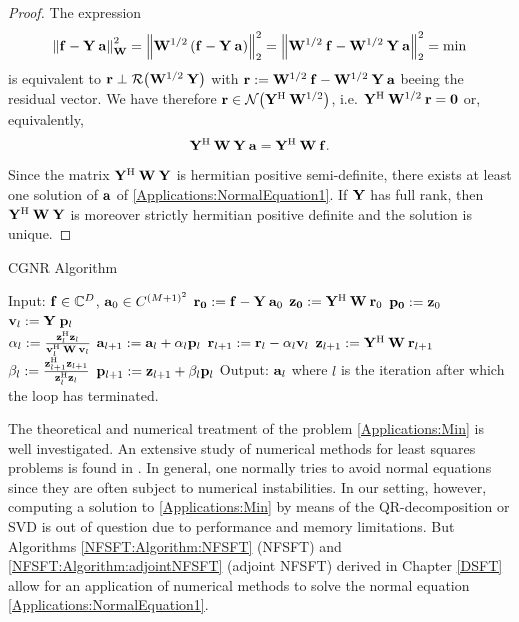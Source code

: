   \begin{proof}
    The expression 
    \[
      \left\|\mathbf{f} - \mathbf{Y}\:\mathbf{a}\right\|_{\mathbf{W}}^2 = 
      \left\|\mathbf{W}^{1/2}\left(\mathbf{f} - \mathbf{Y}\:\mathbf{a}\right)\right\|_{2}^2 = 
      \left\|\mathbf{W}^{1/2}\:\mathbf{f} - \mathbf{W}^{1/2}\:\mathbf{Y}\:\mathbf{a}\right\|_{2}^2 = \text{min}
    \]  
    is equivalent to
    $\mathbf{r} \perp \mathcal{R}{\hspace{-0.4ex}}\left(\mathbf{W}^{1/2}\:\mathbf{Y}\right)$ with $\mathbf{r} := 
    \mathbf{W}^{1/2}\:\mathbf{f} - \mathbf{W}^{1/2}\:\mathbf{Y}\:\mathbf{a}$ beeing the 
    residual vector. We have therefore $\mathbf{r} \in \mathcal{N}{\hspace{-0.4ex}}\left(\mathbf{Y}^{\text{\rm{H}}}\:\mathbf{W}^{1/2}\right)$,
    i.e. $\mathbf{Y}^{\text{\rm{H}}}\:\mathbf{W}^{1/2}\:\mathbf{r} = \mathbf{0}$ or, equivalently,
    \[
      \mathbf{Y^{\text{\rm{H}}}} \: \mathbf{W} \: \mathbf{Y} \: \mathbf{a} = \mathbf{Y^{\text{\rm{H}}}} \: \mathbf{W} \: \mathbf{f}.
    \]
    Since the matrix $\mathbf{Y^{\text{\rm{H}}}} \: \mathbf{W} \: \mathbf{Y}$ is hermitian positive semi-definite, there 
    exists at least one solution of $\mathbf{a}$ of \eqref{Applications:NormalEquation1}. If 
    $\mathbf{Y}$ has full rank, then $\mathbf{Y}^{\text{\rm{H}}} \: \mathbf{W} \: \mathbf{Y}$ is moreover strictly 
    hermitian positive definite and the solution is unique.
  \end{proof}

  \begin{algorithm}[tb]
    \caption{CGNR Algorithm}
    \label{Applications:Algorithm:CGNR}    
	  \begin{algorithmic}
	    \STATE  Input:  $\mathbf{f} \in \mathbb{C}^{D}$, $\mathbf{a}_{0} \in C^{(M+1)^2}$
	    \STATE
	    \STATE $\mathbf{r_{0}} := \mathbf{f} - \mathbf{Y} \: \mathbf{a}_{0}$
	    \STATE $\mathbf{z_{0}} := \mathbf{Y}^{\text{\rm{H}}} \: \mathbf{W} \: \mathbf{r}_{0}$
	    \STATE $\mathbf{p_{0}} := \mathbf{z}_{0}$
	    \STATE 
	      \STATE $\mathbf{v}_{l} := \mathbf{Y} \; \mathbf{p}_{l}$\\[0.5ex]
	      \STATE $\alpha_{l} := \frac{\mathbf{z}_{l}^{\text{\rm{H}}} \mathbf{z}_{l}}{\mathbf{v}_{l}^{\text{\rm{H}}} \: \mathbf{W} \: \mathbf{v}_{l}}$  
	      \STATE $\mathbf{a}_{l+1} := \mathbf{a}_{l} + \alpha_{l} \mathbf{p}_{l}$
	      \STATE $\mathbf{r}_{l+1} := \mathbf{r}_{l} - \alpha_{l} \mathbf{v}_{l}$
	      \STATE $\mathbf{z}_{l+1} := \mathbf{Y}^{\text{\rm{H}}} \: \mathbf{W} \: \mathbf{r}_{l+1}$
	      \STATE $\beta_{l}   := \frac{\mathbf{z}_{l+1}^{\text{\rm{H}}} \mathbf{z}_{l+1}}{\mathbf{z}_{l}^{\text{\rm{H}}} \mathbf{z}_{l}}$
	      \STATE $\mathbf{p}_{l+1} := \mathbf{z}_{l+1} + \beta_{l} \mathbf{p}_{l}$
	    \ENDFOR
	    \STATE
	    \STATE Output: $\mathbf{a}_{l}$ where $l$ is the iteration after which the loop has terminated.
	  \end{algorithmic}
  \end{algorithm}
  
  The theoretical and numerical treatment of the problem \eqref{Applications:Min}
  is well investigated. An extensive study of numerical methods for least 
  squares problems is found in \cite{bjoerk}. In general, one normally tries to
  avoid normal equations since they are often subject to numerical instabilities. In
  our setting, however, computing a solution to \eqref{Applications:Min}
  by means of the QR-decomposition or SVD is out of question due to performance and memory limitations. 
  But Algorithms \ref{NFSFT:Algorithm:NFSFT} (NFSFT) and \ref{NFSFT:Algorithm:adjointNFSFT} 
  (adjoint NFSFT) derived in Chapter \ref{DSFT} allow for an application of 
  numerical methods to solve the normal equation \eqref{Applications:NormalEquation1}. 
  

